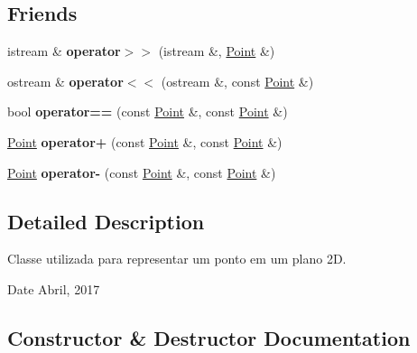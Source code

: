 \subsection*{Friends}
\begin{DoxyCompactItemize}
\item 
\mbox{\label{class_point_a39769dc77d3fa4d361db4ed5822510d6}} 
istream \& {\bfseries operator$>$$>$} (istream \&, \hyperlink{class_point}{Point} \&)
\item 
\mbox{\label{class_point_a1a8476a65036945b3fa49c2b6789264e}} 
ostream \& {\bfseries operator$<$$<$} (ostream \&, const \hyperlink{class_point}{Point} \&)
\item 
\mbox{\label{class_point_a4832a8cf1853edeea25376cb501be7e2}} 
bool {\bfseries operator==} (const \hyperlink{class_point}{Point} \&, const \hyperlink{class_point}{Point} \&)
\item 
\mbox{\label{class_point_a379ea470d116d5ec7858c3b1c88051fa}} 
\hyperlink{class_point}{Point} {\bfseries operator+} (const \hyperlink{class_point}{Point} \&, const \hyperlink{class_point}{Point} \&)
\item 
\mbox{\label{class_point_adc0ae410968ebfcac79ebcf9d4eb3f5b}} 
\hyperlink{class_point}{Point} {\bfseries operator-\/} (const \hyperlink{class_point}{Point} \&, const \hyperlink{class_point}{Point} \&)
\end{DoxyCompactItemize}


\subsection{Detailed Description}
Classe utilizada para representar um ponto em um plano 2D. 

\begin{DoxyDate}{Date}
Abril, 2017 
\end{DoxyDate}


\subsection{Constructor \& Destructor Documentation}
\mbox{\label{class_point_ad92f2337b839a94ce97dcdb439b4325a}} 
